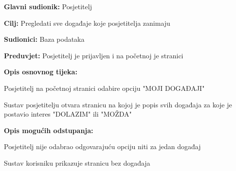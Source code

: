 					\noindent {}
\begin{packed_item}
	\item \textbf{Glavni sudionik:} Posjetitelj
	\item  \textbf{Cilj:} Pregledati sve događaje koje posjetitelja zanimaju
	\item  \textbf{Sudionici:} Baza podataka
	\item  \textbf{Preduvjet:} Posjetitelj je prijavljen i na početnoj je stranici
	\item  \textbf{Opis osnovnog tijeka:}
	
	\item[] \begin{packed_enum}
		
		\item Posjetitelj na početnoj stranici odabire opciju "MOJI DOGAĐAJI"
		\item Sustav posjetitelju otvara stranicu na kojoj je popis svih događaja za koje je postavio interes "DOLAZIM" ili "MOŽDA"
	\end{packed_enum}
	
	\item  \textbf{Opis mogućih odstupanja:}
	
	\item[] \begin{packed_item}
		
		\item[2.a] Posjetitelj nije odabrao odgovarajuću opciju niti za jedan događaj
		\item[] \begin{packed_enum}
			
			\item Sustav korisniku prikazuje stranicu bez događaja
			
		\end{packed_enum}
	\end{packed_item}
\end{packed_item}


